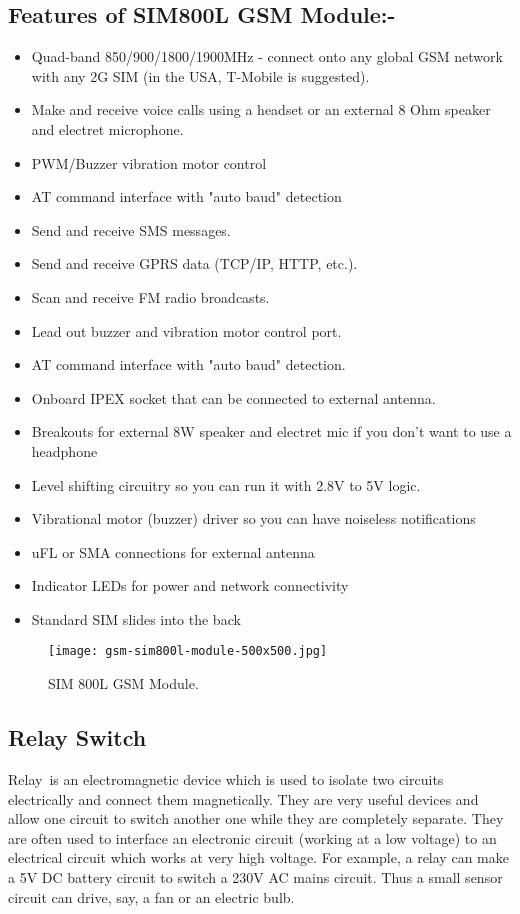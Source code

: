 \subsection*{Features of SIM800L GSM Module:-}
\begin{itemize}
	\item Quad-band 850/900/1800/1900MHz - connect onto any global GSM network with any 2G SIM (in the USA, T-Mobile is suggested).
	\item Make and receive voice calls using a headset or an external 8 Ohm speaker and electret microphone.
	\item PWM/Buzzer vibration motor control
	\item AT command interface with "auto baud" detection
	\item Send and receive SMS messages.
	\item Send and receive GPRS data (TCP/IP, HTTP, etc.).
	\item Scan and receive FM radio broadcasts.
	\item Lead out buzzer and vibration motor control port.
	\item AT command interface with "auto baud" detection.
	\item Onboard IPEX socket that can be connected to external antenna.
	\item Breakouts for external 8W speaker and electret mic if you don't want to use a headphone
	\item Level shifting circuitry so you can run it with 2.8V to 5V logic.
	\item Vibrational motor (buzzer) driver so you can have noiseless notifications
	\item uFL or SMA connections for external antenna
	\item Indicator LEDs for power and network connectivity
	\item Standard SIM slides into the back
\end{itemize}
\pagebreak	
\begin{figure}[h]
	\centering
	\texttt{[image: gsm-sim800l-module-500x500.jpg]}
	\caption{SIM 800L GSM Module.}
\end{figure}
\subsection{Relay Switch}
Relay is an electromagnetic device which is used to isolate two circuits electrically
and connect them magnetically. They are very useful devices and allow one circuit
to switch another one while they are completely separate. They are often used to
interface an electronic circuit (working at a low voltage) to an electrical circuit
which works at very high voltage. For example, a relay can make a 5V DC battery
circuit to switch a 230V AC mains circuit. Thus a small sensor circuit can drive, say,
a fan or an electric bulb.\vspace{.3cm}

